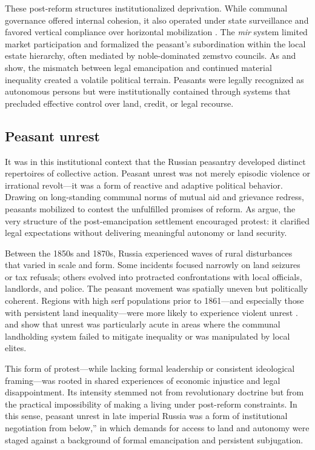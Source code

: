 \documentclass[10pt]{scrarticle}
\begin{document}
These post-reform structures institutionalized deprivation. While communal governance offered internal cohesion, it also operated under state surveillance and favored vertical compliance over horizontal mobilization \cite{dennison_living_2012}. The \textit{mir} system limited market participation and formalized the peasant’s subordination within the local estate hierarchy, often mediated by noble-dominated zemstvo councils. As \cite{popov_factors_2023} and \cite{finkel_does_2015} show, the mismatch between legal emancipation and continued material inequality created a volatile political terrain. Peasants were legally recognized as autonomous persons but were institutionally contained through systems that precluded effective control over land, credit, or legal recourse.

\subsection{Peasant unrest}

It was in this institutional context that the Russian peasantry developed distinct repertoires of collective action. Peasant unrest was not merely episodic violence or irrational revolt—it was a form of reactive and adaptive political behavior. Drawing on long-standing communal norms of mutual aid and grievance redress, peasants mobilized to contest the unfulfilled promises of reform. As \cite{finkel_does_2015} argue, the very structure of the post-emancipation settlement encouraged protest: it clarified legal expectations without delivering meaningful autonomy or land security.

Between the 1850s and 1870s, Russia experienced waves of rural disturbances that varied in scale and form. Some incidents focused narrowly on land seizures or tax refusals; others evolved into protracted confrontations with local officials, landlords, and police. The peasant movement was spatially uneven but politically coherent. Regions with high serf populations prior to 1861—and especially those with persistent land inequality—were more likely to experience violent unrest \cite{kofanov_land_2020}. \cite{dower_collective_2017} and \cite{popov_factors_2023} show that unrest was particularly acute in areas where the communal landholding system failed to mitigate inequality or was manipulated by local elites.

This form of protest—while lacking formal leadership or consistent ideological framing—was rooted in shared experiences of economic injustice and legal disappointment. Its intensity stemmed not from revolutionary doctrine but from the practical impossibility of making a living under post-reform constraints. In this sense, peasant unrest in late imperial Russia was a form of institutional negotiation from below,” in which demands for access to land and autonomy were staged against a background of formal emancipation and persistent subjugation.
\end{document}
